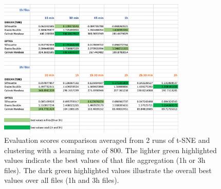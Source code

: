 \begin{figure}[H]
  \centering
  \includegraphics[width=0.8\textwidth]{./images/clusteringResults/clusteringResults5.png}
  \caption{Evaluation scores comparison averaged from 2 runs of t-SNE and clustering with a learning rate of 800. The lighter green highlighted values indicate the best values of that file aggregation (1h or 3h files). The dark green highlighted values illustrate the overall best values over all files (1h and 3h files).}
  \label{figure:clusteringResults5}
\end{figure}


\clearpage